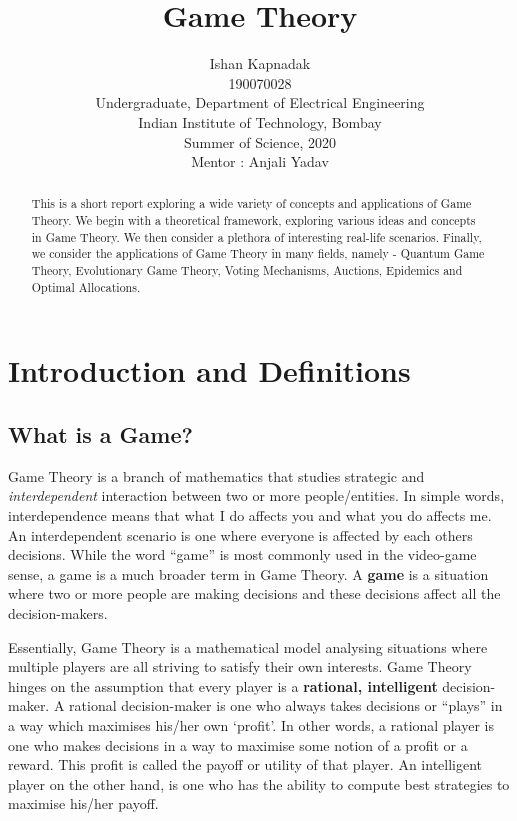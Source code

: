 \documentclass{article}
\title{Game Theory}
\author{
  Ishan Kapnadak\\
  190070028\\
  Undergraduate, Department of Electrical Engineering\\
  Indian Institute of Technology, Bombay\\
  Summer of Science, 2020\\
  Mentor : Anjali Yadav
}
\theoremstyle{definition}
\begin{document}
\maketitle
\begin{adjustwidth}{10mm}{10mm}
	\begin{abstract}
	\centering
	This is a short report exploring a wide variety of concepts and applications of Game Theory. We begin with a theoretical framework, exploring various ideas and concepts in Game Theory. We then consider a plethora of interesting real-life scenarios. Finally, we consider the applications of Game Theory in many fields, namely - Quantum Game Theory, Evolutionary Game Theory, Voting Mechanisms, Auctions, Epidemics and Optimal Allocations.
	\end{abstract}
\end{adjustwidth}
\tableofcontents
\bigskip


\section{Introduction and Definitions}

\subsection{What is a Game?} 

Game Theory is a branch of mathematics that studies strategic and \textit{interdependent} interaction between two or more people/entities. In simple words, interdependence means that what I do affects you and what you do affects me. An interdependent scenario is one where everyone is affected by each others decisions. While the word ``game'' is most commonly used in the video-game sense, a game is a much broader term in Game Theory. A \textbf{game} is a situation where two or more people are making decisions and these decisions affect all the decision-makers. \medskip

Essentially, Game Theory is a mathematical model analysing situations where multiple players are all striving to satisfy their own interests. Game Theory hinges on the assumption that every player is a \textbf{rational, intelligent} decision-maker. A rational decision-maker is one who always takes decisions or ``plays'' in a way which maximises his/her own `profit'. In other words, a rational player is one who makes decisions in a way to maximise some notion of a profit or a reward. This profit is called the payoff or utility of that player. An intelligent player on the other hand, is one who has the ability to compute best strategies to maximise his/her payoff. 
\end{document}
